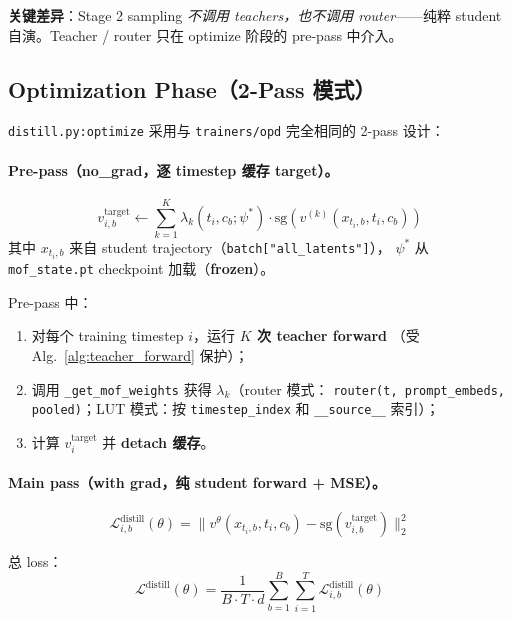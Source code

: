 \documentclass[11pt,a4paper]{article}
\newcommand{\loss}{\mathcal{L}}
\newcommand{\sg}{\mathrm{sg}}
\theoremstyle{definition}
\begin{document}
\textbf{关键差异}：Stage 2 sampling \emph{不调用 teachers，也不调用
router}——纯粹 student 自演。Teacher / router 只在 optimize 阶段的
pre-pass 中介入。

\subsection{Optimization Phase（2-Pass 模式）}

\texttt{distill.py:optimize} 采用与 \texttt{trainers/opd}
完全相同的 2-pass 设计：

\paragraph{Pre-pass（no\_grad，逐 timestep 缓存 target）。}
\begin{equation}
v^{\text{target}}_{i,b} \gets \sum_{k=1}^K \lambda_k(t_i, c_b; \psi^*) \cdot \sg(v^{(k)}(x_{t_i,b}, t_i, c_b))
\label{eq:target_construction}
\end{equation}
其中 $x_{t_i,b}$ 来自 student trajectory（\texttt{batch["all\_latents"]}），
$\psi^*$ 从 \texttt{mof\_state.pt} checkpoint 加载（\textbf{frozen}）。

Pre-pass 中：
\begin{enumerate}[leftmargin=1.5em]
\item 对每个 training timestep $i$，运行 \textbf{$K$ 次 teacher forward}
  （受 Alg.~\ref{alg:teacher_forward} 保护）；
\item 调用 \texttt{\_get\_mof\_weights} 获得 $\lambda_k$（router 模式：
  \texttt{router(t, prompt\_embeds, pooled)}；LUT 模式：按
  \texttt{timestep\_index} 和 \texttt{\_\_source\_\_} 索引）；
\item 计算 $v^{\text{target}}_i$ 并 \textbf{detach 缓存}。
\end{enumerate}

\paragraph{Main pass（with grad，纯 student forward + MSE）。}
\begin{equation}
\boxed{
\loss_{i,b}^{\text{distill}}(\theta) = \big\|v^\theta(x_{t_i,b}, t_i, c_b) - \sg(v^{\text{target}}_{i,b})\big\|_2^2
}
\label{eq:distill_loss}
\end{equation}

总 loss：
\begin{equation}
\loss^{\text{distill}}(\theta) = \frac{1}{B \cdot T \cdot d}\sum_{b=1}^B \sum_{i=1}^T \loss_{i,b}^{\text{distill}}(\theta)
\label{eq:distill_total}
\end{equation}
\end{document}
